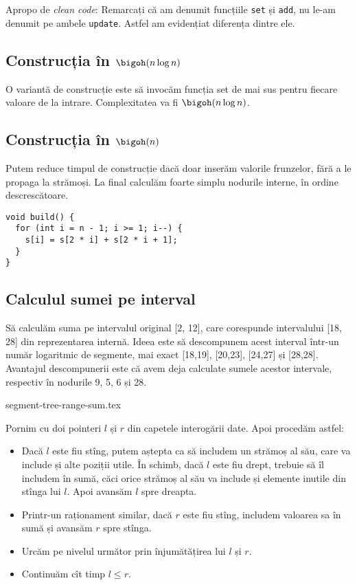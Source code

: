 Apropo de \textit{clean code}: Remarcați că am denumit funcțiile \texttt{set} și \texttt{add}, nu le-am denumit pe ambele \texttt{update}. Astfel am evidențiat diferența dintre ele.

\subsection{Construcția în \texorpdfstring{$\bigoh(n \log n)$}{O(n log n)}}

O variantă de construcție este să invocăm funcția set de mai sus pentru fiecare valoare de la intrare. Complexitatea va fi $\bigoh(n \log n)$.

\subsection{Construcția în \texorpdfstring{$\bigoh(n)$}{O(n)}}

Putem reduce timpul de construcție dacă doar inserăm valorile frunzelor, fără a le propaga la strămoși. La final calculăm foarte simplu nodurile interne, în ordine descrescătoare.

\begin{verbatim}
void build() {
  for (int i = n - 1; i >= 1; i--) {
    s[i] = s[2 * i] + s[2 * i + 1];
  }
}
\end{verbatim}

\subsection{Calculul sumei pe interval}

Să calculăm suma pe intervalul original [2, 12], care corespunde intervalului [18, 28] din reprezentarea internă. Ideea este să descompunem acest interval într-un număr logaritmic de segmente, mai exact [18,19], [20,23], [24,27] și [28,28]. Avantajul descompunerii este că avem deja calculate sumele acestor intervale, respectiv în nodurile 9, 5, 6 și 28.

{segment-tree-range-sum.tex}

Pornim cu doi pointeri $l$ și $r$ din capetele interogării date. Apoi procedăm astfel:

\begin{itemize}
  \item Dacă $l$ este fiu stîng, putem aștepta ca să includem un strămoș al său, care va include și alte poziții utile. În schimb, dacă $l$ este fiu drept, trebuie să îl includem în sumă, căci orice strămoș al său va include și elemente inutile din stînga lui $l$. Apoi avansăm $l$ spre dreapta.

  \item Printr-un raționament similar, dacă $r$ este fiu stîng, includem valoarea sa în sumă și avansăm $r$ spre stînga.

  \item Urcăm pe nivelul următor prin înjumătățirea lui $l$ și $r$.

  \item Continuăm cît timp $l \leq r$.
\end{itemize}

